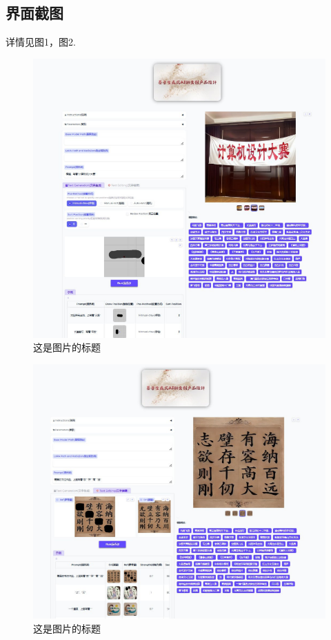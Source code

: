 \documentclass[a4paper,12pt]{article}
\begin{document}
\subsection{界面截图}
详情见图1，图2.
\begin{figure}[htbp] %
    \centering %
    \includegraphics[width=1\textwidth]{Image/UI_1.png} %
    \caption{这是图片的标题} %
    \label{fig:logo} %
\end{figure}
\begin{figure}[htbp] %
    \centering %
    \includegraphics[width=1\textwidth]{Image/UI_2.png} %
    \caption{这是图片的标题} %
    \label{fig:logo} %
\end{figure}
\end{document}
